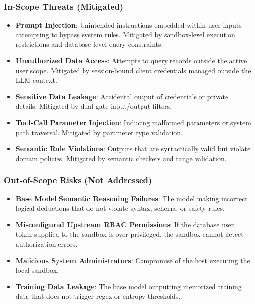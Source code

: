 \documentclass[10pt,journal,compsoc]{IEEEtran}
\begin{document}
\subsubsection{In-Scope Threats (Mitigated)}
\begin{itemize}
  \item \textbf{Prompt Injection}: Unintended instructions embedded within user inputs attempting to bypass system rules. Mitigated by sandbox-level execution restrictions and database-level query constraints.
  \item \textbf{Unauthorized Data Access}: Attempts to query records outside the active user scope. Mitigated by session-bound client credentials managed outside the LLM context.
  \item \textbf{Sensitive Data Leakage}: Accidental output of credentials or private details. Mitigated by dual-gate input/output filters.
  \item \textbf{Tool-Call Parameter Injection}: Inducing malformed parameters or system path traversal. Mitigated by parameter type validation.
  \item \textbf{Semantic Rule Violations}: Outputs that are syntactically valid but violate domain policies. Mitigated by semantic checkers and range validation.
\end{itemize}

\subsubsection{Out-of-Scope Risks (Not Addressed)}
\begin{itemize}
  \item \textbf{Base Model Semantic Reasoning Failures}: The model making incorrect logical deductions that do not violate syntax, schema, or safety rules.
  \item \textbf{Misconfigured Upstream RBAC Permissions}: If the database user token supplied to the sandbox is over-privileged, the sandbox cannot detect authorization errors.
  \item \textbf{Malicious System Administrators}: Compromise of the host executing the local sandbox.
  \item \textbf{Training Data Leakage}: The base model outputting memorized training data that does not trigger regex or entropy thresholds.
\end{itemize}
\end{document}
